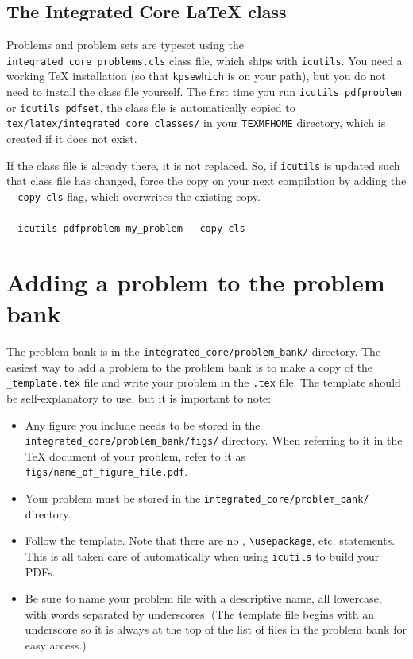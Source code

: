 \subsection{The Integrated Core LaTeX class}
Problems and problem sets are typeset using the \verb|integrated_core_problems.cls| class file, which ships with \texttt{icutils}. You need a working TeX installation (so that \verb|kpsewhich| is on your path), but you do not need to install the class file yourself. The first time you run \verb|icutils pdfproblem| or \verb|icutils pdfset|, the class file is automatically copied to \verb|tex/latex/integrated_core_classes/| in your \verb|TEXMFHOME| directory, which is created if it does not exist.

If the class file is already there, it is not replaced. So, if \texttt{icutils} is updated such that class file has changed, force the copy on your next compilation by adding the \verb|--copy-cls| flag, which overwrites the existing copy.\\\\
\verb|  icutils pdfproblem my_problem --copy-cls|


\pagebreak

\section{Adding a problem to the problem bank}
The problem bank is in the \verb|integrated_core/problem_bank/| directory. The easiest way to add a problem to the problem bank is to make a copy of the \verb|_template.tex| file and write your problem in the \verb|.tex| file. The template should be self-explanatory to use, but it is important to note:
\begin{itemize}
  \item Any figure you include needs to be stored in the \verb|integrated_core/problem_bank/figs/| directory. When referring to it in the TeX document of your problem, refer to it as \verb|figs/name_of_figure_file.pdf|.
  \item Your problem must be stored in the \verb|integrated_core/problem_bank/| directory.
  \item Follow the template. Note that there are no \verb||, \verb|\usepackage|, etc. statements. This is all taken care of automatically when using \texttt{icutils} to build your PDFs.
  \item Be sure to name your problem file with a descriptive name, all lowercase, with words separated by underscores. (The template file begins with an underscore so it is always at the top of the list of files in the problem bank for easy access.)
\end{itemize}

